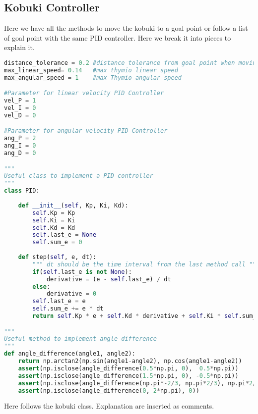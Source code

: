\subsection*{Kobuki Controller}
Here we have all the methods to move the kobuki to a goal point or follow a list of goal point with the same PID controller. Here we break it into pieces to explain it.
\begin{lstlisting}[caption={Kobuki PID Controller},label={lst:kobukicontroller},language=Python]
distance_tolerance = 0.2 #distance tolerance from goal point when moving
max_linear_speed= 0.14   #max thymio linear speed
max_angular_speed = 1    #max Thymio angular speed

#Parameter for linear velocity PID Controller
vel_P = 1
vel_I = 0
vel_D = 0

#Parameter for angular velocity PID Controller
ang_P = 2
ang_I = 0
ang_D = 0

"""
Useful class to implement a PID controller
"""
class PID:
    
    def __init__(self, Kp, Ki, Kd):
        self.Kp = Kp
        self.Ki = Ki
        self.Kd = Kd
        self.last_e = None
        self.sum_e = 0
        
    def step(self, e, dt):
        """ dt should be the time interval from the last method call """
        if(self.last_e is not None):
            derivative = (e - self.last_e) / dt
        else:
            derivative = 0
        self.last_e = e
        self.sum_e += e * dt
        return self.Kp * e + self.Kd * derivative + self.Ki * self.sum_e

"""
Useful method to implement angle difference
"""
def angle_difference(angle1, angle2):
    return np.arctan2(np.sin(angle1-angle2), np.cos(angle1-angle2))
    assert(np.isclose(angle_difference(0.5*np.pi, 0),  0.5*np.pi))
    assert(np.isclose(angle_difference(1.5*np.pi, 0), -0.5*np.pi))
    assert(np.isclose(angle_difference(np.pi*-2/3, np.pi*2/3), np.pi*2/3))
    assert(np.isclose(angle_difference(0, 2*np.pi), 0))
\end{lstlisting}
Here follows the kobuki class. Explanation are inserted as comments.
